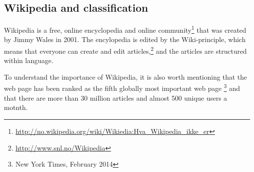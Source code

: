 \documentclass[11pt,english,a4paper]{article}
\begin{document}





\subsection*{Wikipedia and classification}
Wikipedia is a free, online encyclopedia and online community\footnote{\url{http://no.wikipedia.org/wiki/Wikiedia:Hva_Wikipedia_ikke_er}} that was created by Jimmy Wales in 2001. The encylopedia is edited by the Wiki-principle, which means that everyone can create and edit articles,\footnote{\url{http://www.snl.no/Wikipedia}} and the articles are structured within language. 

To understand the importance of Wikipedia, it is also worth mentioning that the web page has been ranked as the fifth globally most important web page \footnote{New York Times, February 2014} and that there are more than 30 million articles and almost 500 unique users a motnth. 


\end{document}
